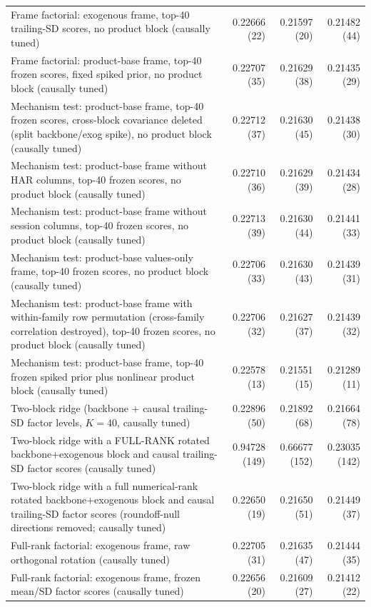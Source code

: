 \begin{longtable}{p{}rrr}
Frame factorial: exogenous frame, top-40 trailing-SD scores, no product block (causally tuned) & 0.22666 (22) & 0.21597 (20) & 0.21482 (44) \\
Frame factorial: product-base frame, top-40 frozen scores, fixed spiked prior, no product block (causally tuned) & 0.22707 (35) & 0.21629 (38) & 0.21435 (29) \\
Mechanism test: product-base frame, top-40 frozen scores, cross-block covariance deleted (split backbone/exog spike), no product block (causally tuned) & 0.22712 (37) & 0.21630 (45) & 0.21438 (30) \\
Mechanism test: product-base frame without HAR columns, top-40 frozen scores, no product block (causally tuned) & 0.22710 (36) & 0.21629 (39) & 0.21434 (28) \\
Mechanism test: product-base frame without session columns, top-40 frozen scores, no product block (causally tuned) & 0.22713 (39) & 0.21630 (44) & 0.21441 (33) \\
Mechanism test: product-base values-only frame, top-40 frozen scores, no product block (causally tuned) & 0.22706 (33) & 0.21630 (43) & 0.21439 (31) \\
Mechanism test: product-base frame with within-family row permutation (cross-family correlation destroyed), top-40 frozen scores, no product block (causally tuned) & 0.22706 (32) & 0.21627 (37) & 0.21439 (32) \\
Mechanism test: product-base frame, top-40 frozen spiked prior plus nonlinear product block (causally tuned) & 0.22578 (13) & 0.21551 (15) & 0.21289 (11) \\
Two-block ridge (backbone + causal trailing-SD factor levels, $K=40$, causally tuned) & 0.22896 (50) & 0.21892 (68) & 0.21664 (78) \\
Two-block ridge with a FULL-RANK rotated backbone+exogenous block and causal trailing-SD factor scores (causally tuned) & 0.94728 (149) & 0.66677 (152) & 0.23035 (142) \\
Two-block ridge with a full numerical-rank rotated backbone+exogenous block and causal trailing-SD factor scores (roundoff-null directions removed; causally tuned) & 0.22650 (19) & 0.21650 (51) & 0.21449 (37) \\
Full-rank factorial: exogenous frame, raw orthogonal rotation (causally tuned) & 0.22705 (31) & 0.21635 (47) & 0.21444 (35) \\
Full-rank factorial: exogenous frame, frozen mean/SD factor scores (causally tuned) & 0.22656 (20) & 0.21609 (27) & 0.21412 (22) \\

\end{longtable}
